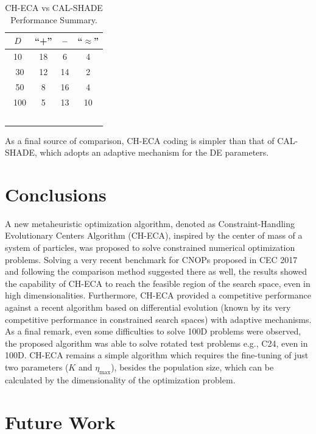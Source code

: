 \documentclass[conference]{IEEEtran}
\begin{document}
\begin{table}[!ht]
	\caption{CH-ECA vs CAL-SHADE Performance Summary.}
	\label{tab:summary}
	\centering
	\begin{tabular}{c|ccc}
		$D$ & ``+'' &  -- & ``$\approx$'' \\ \hline
		10  & 18    &  6  & 4  \\ \
		30  & 12    &  14 & 2  \\ \
		50  & 8     &  16 & 4 \\ \
	   100  & 5     &  13 & 10  \\ \
	\end{tabular}
\end{table}

As a final source of comparison, CH-ECA coding is simpler than that of CAL-SHADE, 
which adopts an adaptive mechanism for the DE parameters. 

\section{Conclusions} %
\label{sec:conclusions}

A new metaheuristic optimization algorithm, denoted as Constraint-Handling Evolutionary 
Centers  Algorithm (CH-ECA), inspired by the center of mass of a system of particles, 
was proposed to solve constrained numerical optimization problems. Solving a very 
recent benchmark for CNOPs proposed in CEC 2017 and following the comparison method 
suggested there as well, the results showed the capability of CH-ECA to reach the 
feasible region of the search space, even in high dimensionalities. Furthermore, 
CH-ECA provided a competitive performance against a recent algorithm based on 
differential evolution (known by its very competitive performance in constrained 
search spaces) with adaptive mechanisms. As a final remark, even some difficulties 
to solve 100D problems were observed, the proposed algorithm was able to solve 
rotated test problems e.g., C24, even in 100D. CH-ECA remains a simple algorithm 
which requires the fine-tuning of just two parameters ($K$ and $\eta_{\max}$),  
besides the population size, which can be calculated by the dimensionality of the 
optimization problem.%


\section{Future Work} %
\label{sec:future_work}
\end{document}
